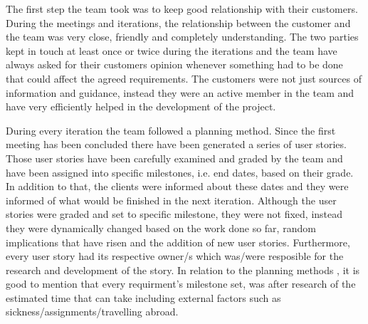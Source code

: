 \documentclass{l3proj}
\begin{document}
The first step the team took was to keep good relationship with their customers. During the meetings and iterations, the relationship
between the customer and the team was very close, friendly and completely understanding. The two parties kept in touch at least once or twice during the
iterations and the team have always asked for their customers opinion whenever something had to be done that could affect the agreed requirements.
The customers were not just sources of information and guidance, instead they were an active member in the team and have very
efficiently helped in the development of the project.

During every iteration the team followed a planning method. Since the first meeting has been concluded there have been generated a series of
user stories. Those user stories have been carefully examined and graded by the team and have been assigned into specific milestones, i.e.
end dates, based on their grade. In addition to that, the clients were informed about these dates and they were informed of what would be finished in the next iteration. Although the user stories were graded and set to specific milestone, they were not fixed, instead they were dynamically changed based on the work done so far, random implications that have risen and the addition of new user stories. Furthermore, every user story had its respective owner/s which was/were resposible for the research and development of the story. In relation to the planning methods , it is good to mention that every requirment's milestone set, was after research of the estimated time that can take including external factors such as sickness/assignments/travelling abroad.

\end{document}
